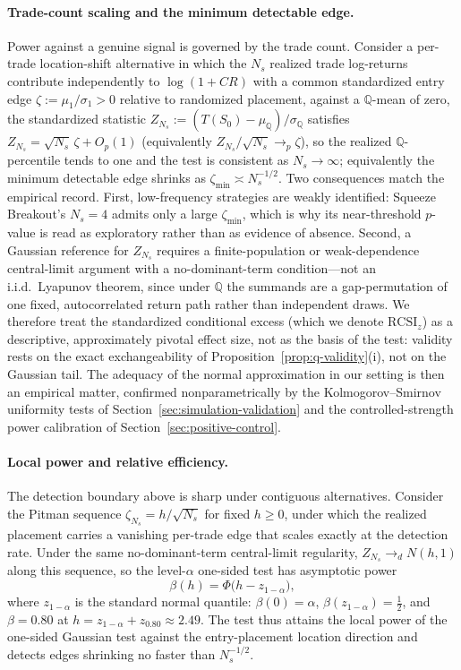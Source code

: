 \documentclass[preprint,12pt]{elsarticle}
\theoremstyle{definition}
\begin{document}
\paragraph{Trade-count scaling and the minimum detectable edge.} Power against a genuine signal is governed by the trade count. Consider a per-trade location-shift alternative in which the $N_s$ realized trade log-returns contribute independently to $\log(1+CR)$ with a common standardized entry edge $\zeta:=\mu_1/\sigma_1>0$ relative to randomized placement, against a $\mathbb{Q}$-mean of zero, the standardized statistic $Z_{N_s}:=(T(S_0)-\mu_{\mathbb Q})/\sigma_{\mathbb Q}$ satisfies $Z_{N_s}=\sqrt{N_s}\,\zeta+O_p(1)$ (equivalently $Z_{N_s}/\sqrt{N_s}\to_p\zeta$), so the realized $\mathbb{Q}$-percentile tends to one and the test is consistent as $N_s\to\infty$; equivalently the minimum detectable edge shrinks as $\zeta_{\min}\asymp N_s^{-1/2}$. Two consequences match the empirical record. First, low-frequency strategies are weakly identified: Squeeze Breakout's $N_s=4$ admits only a large $\zeta_{\min}$, which is why its near-threshold $p$-value is read as exploratory rather than as evidence of absence. Second, a Gaussian reference for $Z_{N_s}$ requires a finite-population or weak-dependence central-limit argument with a no-dominant-term condition---not an i.i.d.\ Lyapunov theorem, since under $\mathbb{Q}$ the summands are a gap-permutation of one fixed, autocorrelated return path rather than independent draws. We therefore treat the standardized conditional excess (which we denote $\mathrm{RCSI}_z$) as a descriptive, approximately pivotal effect size, not as the basis of the test: validity rests on the exact exchangeability of Proposition~\ref{prop:q-validity}(i), not on the Gaussian tail. The adequacy of the normal approximation in our setting is then an empirical matter, confirmed nonparametrically by the Kolmogorov--Smirnov uniformity tests of Section~\ref{sec:simulation-validation} and the controlled-strength power calibration of Section~\ref{sec:positive-control}.

\paragraph{Local power and relative efficiency.} The detection boundary above is sharp under contiguous alternatives. Consider the Pitman sequence $\zeta_{N_s}=h/\sqrt{N_s}$ for fixed $h\ge0$, under which the realized placement carries a vanishing per-trade edge that scales exactly at the detection rate. Under the same no-dominant-term central-limit regularity, $Z_{N_s}\to_d N(h,1)$ along this sequence, so the level-$\alpha$ one-sided test has asymptotic power
\[
\beta(h)=\Phi\big(h-z_{1-\alpha}\big),
\]
where $z_{1-\alpha}$ is the standard normal quantile: $\beta(0)=\alpha$, $\beta(z_{1-\alpha})=\tfrac12$, and $\beta=0.80$ at $h=z_{1-\alpha}+z_{0.80}\approx2.49$. The test thus attains the local power of the one-sided Gaussian test against the entry-placement location direction and detects edges shrinking no faster than $N_s^{-1/2}$.
\end{document}
